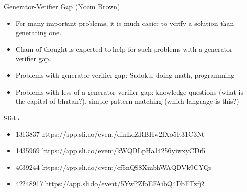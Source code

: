 \begin{frame}{Generator-Verifier Gap (Noam Brown)}

\vfill

\begin{itemize}
    \item For many important problems, it is much easier to
    verify a solution than generating one.
    \item Chain-of-thought is expected to help for such
    problems with a generator-verifier gap.
    \item Problems with generator-verifier gap: Sudoku,
    doing math, programming
    \item Problems with less of a generator-verifier gap:
    knowledge questions (what is the capital of bhutan?),
    simple pattern matching (which language is this?)
    
\end{itemize}

\vfill

\end{frame}

\begin{frame}{Slido}

\vfill

\begin{itemize}
    \item 1313837 https://app.sli.do/event/dinLdZRBHw2fXo5R31C3Nt
    \item 1435969 https://app.sli.do/event/kWQDLpHa14256yiwxyCDr5
    \item 4039244 https://app.sli.do/event/ef5nQS8XmbhWAQDVk9CYQs
    \item 42248917 https://app.sli.do/event/5YwPZfoEFAibQ4DbFTzfj2
\end{itemize}

\vfill

\end{frame}



\endlecture

